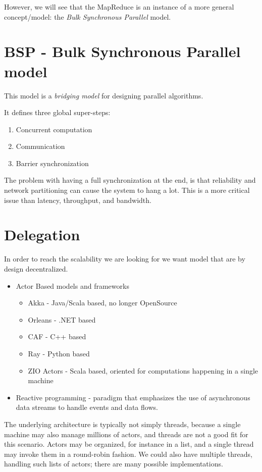 However, we will see that the MapReduce is an instance of a more general concept/model: the \textit{Bulk Synchronous Parallel} model.

\section{BSP - Bulk Synchronous Parallel model}
This model is a \textit{bridging model} for designing parallel algorithms.
{It defines three global super-steps:\ns
\begin{enumerate}
   \item Concurrent computation
   \item Communication
   \item Barrier synchronization
\end{enumerate}}

The problem with having a full synchronization at the end, is that reliability and network partitioning can cause the system to hang a lot.
This is a more critical issue than latency, throughput, and bandwidth.

\section{Delegation}
In order to reach the scalability we are looking for we want model that are by design decentralized.

\begin{itemize}
   \item Actor Based models and frameworks
   \begin{itemize}
      \item Akka - Java/Scala based, no longer OpenSource
      \item Orleans - .NET based
      \item CAF - C++ based
      \item Ray - Python based
      \item ZIO Actors - Scala based, oriented for computations happening in a single machine
   \end{itemize}
   \item Reactive programming - paradigm that emphasizes the use of asynchronous data streams to handle events and data flows.
\end{itemize}

The underlying architecture is typically not simply threads, because a single machine may also manage millions of actors, and threads are not a good fit for this scenario.
Actors may be organized, for instance in a list, and a single thread may invoke them in a round-robin fashion.
We could also have multiple threads, handling such lists of actors; there are many possible implementations.



